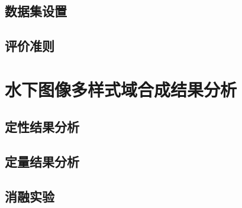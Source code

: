 \subsection{数据集设置}

\subsection{评价准则}

\section{水下图像多样式域合成结果分析}
\subsection{定性结果分析}

\subsection{定量结果分析}


\subsection{消融实验}
